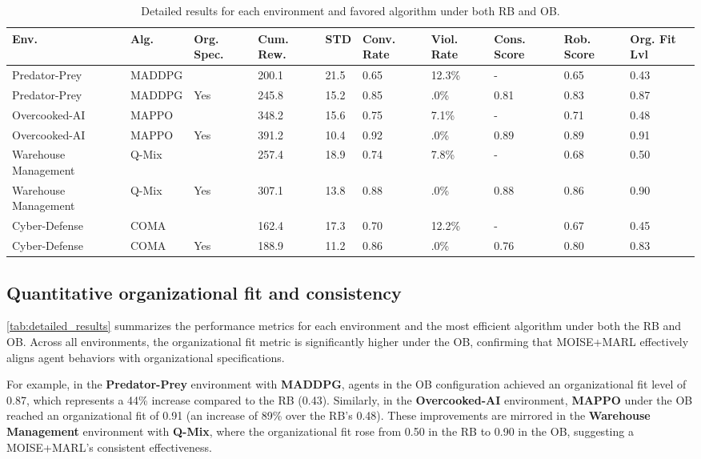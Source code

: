 \documentclass[sigconf]{aamas}
\begin{document}
\begin{table}[h!]
    \centering
    \caption{Detailed results for each environment and favored algorithm under both RB and OB.}
    \label{tab:detailed_results}
    \small
    \renewcommand{\arraystretch}{1.2}
    \begin{tabular}{p{3.5cm}p{1.5cm}p{}p{1.3cm}p{1cm}p{1.3cm}p{1.3cm}p{1.2cm}p{1.2cm}p{1cm}}
        \hline
        \textbf{Env.} & \textbf{Alg.} & \textbf{Org. Spec.} & \textbf{Cum. Rew.} & \textbf{STD} & \textbf{Conv. Rate} & \textbf{Viol. Rate} & \textbf{Cons. Score} & \textbf{Rob. Score} & \textbf{Org. Fit Lvl} \\ \hline
        Predator-Prey & MADDPG &  & 200.1 & 21.5 & 0.65 & 12.3\% & - & 0.65 & 0.43 \\
        Predator-Prey & MADDPG & Yes & 245.8 & 15.2 & 0.85 & .0\% & 0.81 & 0.83 & 0.87 \\
        Overcooked-AI & MAPPO &  & 348.2 & 15.6 & 0.75 & 7.1\% & - & 0.71 & 0.48 \\
        Overcooked-AI & MAPPO & Yes & 391.2 & 10.4 & 0.92 & .0\% & 0.89 & 0.89 & 0.91 \\
        Warehouse Management & Q-Mix &  & 257.4 & 18.9 & 0.74 & 7.8\% & - & 0.68 & 0.50 \\
        Warehouse Management & Q-Mix & Yes & 307.1 & 13.8 & 0.88 & .0\% & 0.88 & 0.86 & 0.90 \\
        Cyber-Defense & COMA &  & 162.4 & 17.3 & 0.70 & 12.2\% & - & 0.67 & 0.45 \\
        Cyber-Defense & COMA & Yes & 188.9 & 11.2 & 0.86 & .0\% & 0.76 & 0.80 & 0.83 \\ \hline
    \end{tabular}
\end{table}

\subsection{Quantitative organizational fit and consistency}

\autoref{tab:detailed_results} summarizes the performance metrics for each environment and the most efficient algorithm under both the RB and OB. Across all environments, the organizational fit metric is significantly higher under the OB, confirming that MOISE+MARL effectively aligns agent behaviors with organizational specifications.

For example, in the \textbf{Predator-Prey} environment with \textbf{MADDPG}, agents in the OB configuration achieved an organizational fit level of 0.87, which represents a 44\% increase compared to the RB (0.43). Similarly, in the \textbf{Overcooked-AI} environment, \textbf{MAPPO} under the OB reached an organizational fit of 0.91 (an increase of 89\% over the RB's 0.48). These improvements are mirrored in the \textbf{Warehouse Management} environment with \textbf{Q-Mix}, where the organizational fit rose from 0.50 in the RB to 0.90 in the OB, suggesting a MOISE+MARL's consistent effectiveness.
\end{document}
